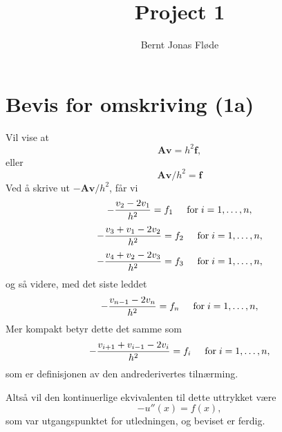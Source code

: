 \documentclass[a4paper,10pt,english]{article}
\title{Project 1
}
\author{Bernt Jonas Fløde
}
\begin{document}
\maketitle

\section*{Bevis for omskriving (1a)}

Vil vise at
\begin{equation*} \mathbf{A} \mathbf{v} = h^2 \mathbf{f},\end{equation*}eller
\begin{equation*} \mathbf{A} \mathbf{v} / h^2 = \mathbf{f}\end{equation*}
Ved å skrive ut $-\mathbf{A} \mathbf{v} / h^2$, får vi
\begin{equation*}-\frac{v_2-2v_1}{h^2} = f_1\hspace{0.5cm}\mathrm{for}\hspace{0.1cm}i=1,\dots, n,\end{equation*}\begin{equation*}-\frac{v_3+v_1-2v_2}{h^2} = f_2\hspace{0.5cm}\mathrm{for}\hspace{0.1cm}i=1,\dots, n,\end{equation*}\begin{equation*}-\frac{v_4+v_2-2v_3}{h^2} = f_3\hspace{0.5cm}\mathrm{for}\hspace{0.1cm}i=1,\dots, n,\end{equation*}og så videre, med det siste leddet
\begin{equation*}-\frac{v_{n-1}-2v_n}{h^2} = f_n\hspace{0.5cm}\mathrm{for}\hspace{0.1cm}i=1,\dots, n,\end{equation*}
Mer kompakt betyr dette det samme som
\begin{equation*}-\frac{v_{i+1}+v_{i-1}-2v_i}{h^2} = f_i\hspace{0.5cm}\mathrm{for}\hspace{0.1cm}i=1,\dots, n,\end{equation*}som er definisjonen av den andrederivertes tilnærming.

Altså vil den kontinuerlige ekvivalenten til dette uttrykket være
\begin{equation*}-u''(x) = f(x),\end{equation*}som var utgangspunktet for utledningen, og beviset er ferdig.
\end{document}
